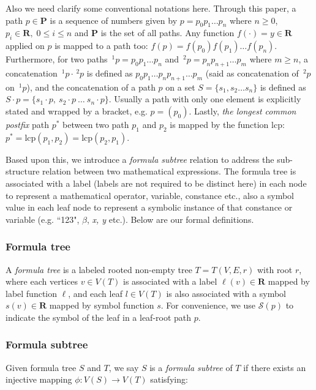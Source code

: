 Also we need clarify some conventional notations here. 
Through this paper, a path $p \in \mathbf{P}$ is a sequence of numbers given by $p = p_0 p_1 \ldots p_n$ where $n\ge0$, $p_i \in \mathbf{R},\; 0 \le i \le n$ and $\mathbf{P}$ is the set of all paths. 
Any function $f(\cdot) = y \in \mathbf{R}$ applied on $p$ is mapped to a path too: $f(p)=f(p_0)f(p_1) \ldots f(p_n)$. 
Furthermore, for two paths $\,^1p = p_0p_1 \ldots p_n$ and $\,^2p = p_np_{n+1} \ldots p_m$ where $m \ge n$, a concatenation $\,^1p \cdot \,^2p$ is defined as $p_0p_1 \ldots p_n p_{n+1} \ldots p_m$ (said as concatenation of $\,^2p$ on $\,^1p$), 
and the concatenation of a path $p$ on a set $S = \{ s_1, s_2 \ldots s_n \}$ is defined as $S \cdot p = \{ s_1\cdot p,\  s_2\cdot p \ \ldots \ s_n\cdot p \}$. 
Usually a path with only one element is explicitly stated and wrapped by a bracket, e.g. $p=(p_0)$. 
Lastly, \textit{the longest common postfix} path $p^*$ between two path $p_1$ and $p_2$ is mapped by the function $\mathrm{lcp}$: $p^* = \mathrm{lcp}(p_1, p_2) = \mathrm{lcp}(p_2, p_1)$.

Based upon this,  we introduce a \textit{formula subtree} relation to address the sub-structure relation between two mathematical expressions. 
The formula tree is associated with a label (labels are not required to be distinct here) in each node to represent a mathematical operator, variable, constance etc., also a symbol value in each leaf node to represent a symbolic instance of that constance or variable (e.g. ``123", $\beta$, \textit{x, y} etc.). 
Below are our formal definitions.

\subsubsection{Formula tree}
A \textit{formula tree} is a labeled rooted non-empty tree $T = T(V,E,r)$ with root $r$, where each vertices $v \in V(T)$ is associated with a label $\ell(v) \in \mathbf{R}$ mapped by label function $\ell$, and each leaf $l \in V(T)$ is also associated with a symbol $s(v) \in \mathbf{R}$ mapped by symbol function $s$. For convenience, we use $\mathcal{S}(p)$ to indicate the symbol of the leaf in a leaf-root path $p$.

\subsubsection{Formula subtree}
\label{frmlsubtreeDef}
Given formula tree $S$ and $T$, we say $S$ is a \textit{formula subtree} of $T$ if there exists an injective mapping $\phi: V(S) \rightarrow V(T)$ satisfying:

